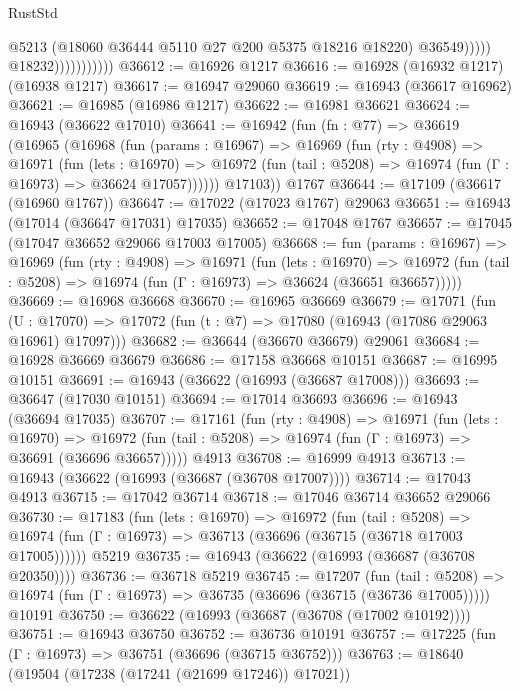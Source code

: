 \begin{lexlean}{RustStd}
\begin{coremodule}
                                    @5213
                                    (@18060 @36444 @5110 @27 @200 @5375 @18216 @18220)
                                    @36549)))))
                          @18232)))))))))))
@36612 := @16926 @1217
@36616 := @16928 (@16932 @1217) (@16938 @1217)
@36617 := @16947 @29060
@36619 := @16943 (@36617 @16962)
@36621 := @16985 (@16986 @1217)
@36622 := @16981 @36621
@36624 := @16943 (@36622 @17010)
@36641 := @16942
    (fun (fn : @77) =>
    @36619
      (@16965
        (@16968
          (fun (params : @16967) =>
          @16969
            (fun (rty : @4908) =>
            @16971
              (fun (lets : @16970) =>
              @16972 (fun (tail : @5208) => @16974 (fun (Γ : @16973) => @36624 @17057))))))
        @17103))
    @1767
@36644 := @17109 (@36617 (@16960 @1767))
@36647 := @17022 (@17023 @1767) @29063
@36651 := @16943 (@17014 (@36647 @17031) @17035)
@36652 := @17048 @1767
@36657 := @17045 (@17047 @36652 @29066 @17003 @17005)
@36668 := fun (params : @16967) =>
  @16969
    (fun (rty : @4908) =>
    @16971
      (fun (lets : @16970) =>
      @16972 (fun (tail : @5208) => @16974 (fun (Γ : @16973) => @36624 (@36651 @36657)))))
@36669 := @16968 @36668
@36670 := @16965 @36669
@36679 := @17071
    (fun (U : @17070) => @17072 (fun (t : @7) => @17080 (@16943 (@17086 @29063 @16961) @17097)))
@36682 := @36644 (@36670 @36679) @29061
@36684 := @16928 @36669 @36679
@36686 := @17158 @36668 @10151
@36687 := @16995 @10151
@36691 := @16943 (@36622 (@16993 (@36687 @17008)))
@36693 := @36647 (@17030 @10151)
@36694 := @17014 @36693
@36696 := @16943 (@36694 @17035)
@36707 := @17161
    (fun (rty : @4908) =>
    @16971
      (fun (lets : @16970) =>
      @16972 (fun (tail : @5208) => @16974 (fun (Γ : @16973) => @36691 (@36696 @36657)))))
    @4913
@36708 := @16999 @4913
@36713 := @16943 (@36622 (@16993 (@36687 (@36708 @17007))))
@36714 := @17043 @4913
@36715 := @17042 @36714
@36718 := @17046 @36714 @36652 @29066
@36730 := @17183
    (fun (lets : @16970) =>
    @16972
      (fun (tail : @5208) =>
      @16974 (fun (Γ : @16973) => @36713 (@36696 (@36715 (@36718 @17003 @17005))))))
    @5219
@36735 := @16943 (@36622 (@16993 (@36687 (@36708 @20350))))
@36736 := @36718 @5219
@36745 := @17207
    (fun (tail : @5208) => @16974 (fun (Γ : @16973) => @36735 (@36696 (@36715 (@36736 @17005)))))
    @10191
@36750 := @36622 (@16993 (@36687 (@36708 (@17002 @10192))))
@36751 := @16943 @36750
@36752 := @36736 @10191
@36757 := @17225 (fun (Γ : @16973) => @36751 (@36696 (@36715 @36752)))
@36763 := @18640 (@19504 (@17238 (@17241 (@21699 @17246)) @17021))

\end{coremodule}
\end{lexlean}
